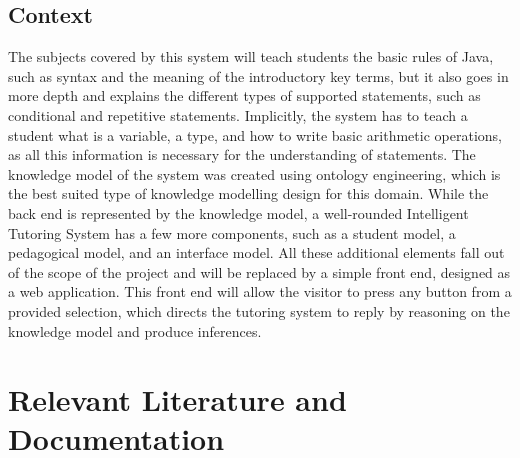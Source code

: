 \documentclass[titlepage]{article}
\begin{document}
\subsection{Context}
The subjects covered by this system will teach students the basic rules of Java, such as syntax and the meaning of the introductory key terms, but it also goes in more depth and explains the different types of supported statements, such as conditional and repetitive statements. Implicitly, the system has to teach a student what is a variable, a type, and how to write basic arithmetic operations, as all this information is necessary for the understanding of statements.
\newline
The knowledge model of the system was created using ontology engineering, which is the best suited type of knowledge modelling design for this domain.
\newline
While the back end is represented by the knowledge model, a well-rounded Intelligent Tutoring System has a few more components, such as a student model, a pedagogical model, and an interface model. All these additional elements fall out of the scope of the project and will be replaced by a simple front end, designed as a web application. This front end will allow the visitor to press any button from a provided selection, which directs the tutoring system to reply by reasoning on the knowledge model and produce inferences.
\newpage
\section{Relevant Literature and Documentation}
\end{document}
